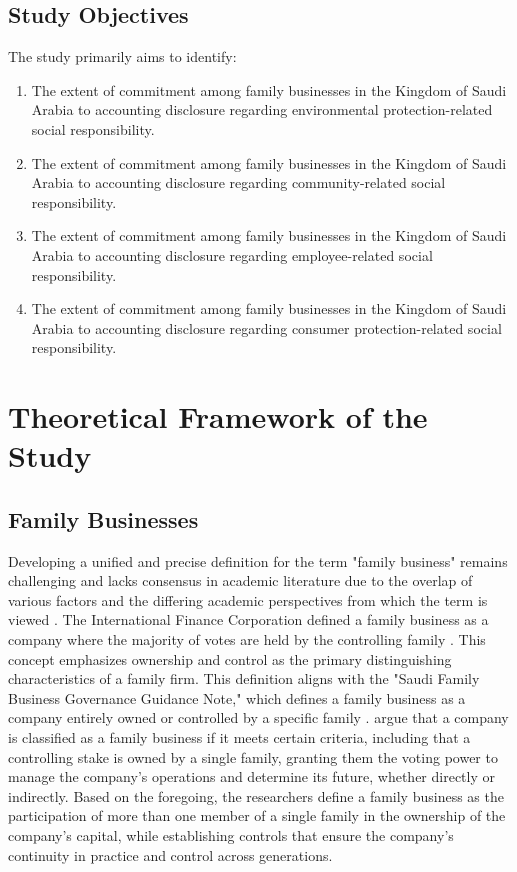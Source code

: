 \documentclass[10pt]{NSP1}
\begin{document}
	\subsection{Study Objectives}
	
	The study primarily aims to identify:
	\begin{enumerate}
		\item The extent of commitment among family businesses in the Kingdom of Saudi Arabia to accounting disclosure regarding environmental protection-related social responsibility.
		\item The extent of commitment among family businesses in the Kingdom of Saudi Arabia to accounting disclosure regarding community-related social responsibility.
		\item The extent of commitment among family businesses in the Kingdom of Saudi Arabia to accounting disclosure regarding employee-related social responsibility.
		\item The extent of commitment among family businesses in the Kingdom of Saudi Arabia to accounting disclosure regarding consumer protection-related social responsibility.
	\end{enumerate}
	
	\section{Theoretical Framework of the Study}
	
	\subsection{Family Businesses}
	
	Developing a unified and precise definition for the term "family business" remains challenging and lacks consensus in academic literature due to the overlap of various factors and the differing academic perspectives from which the term is viewed \cite{AlZahrani2023}. The International Finance Corporation defined a family business as a company where the majority of votes are held by the controlling family \cite{IFC2011}. This concept emphasizes ownership and control as the primary distinguishing characteristics of a family firm. This definition aligns with the "Saudi Family Business Governance Guidance Note," which defines a family business as a company entirely owned or controlled by a specific family \cite{SaudiGov2014}. \cite{AlOwais2020} argue that a company is classified as a family business if it meets certain criteria, including that a controlling stake is owned by a single family, granting them the voting power to manage the company's operations and determine its future, whether directly or indirectly. Based on the foregoing, the researchers define a family business as the participation of more than one member of a single family in the ownership of the company's capital, while establishing controls that ensure the company's continuity in practice and control across generations.
	
\end{document}
